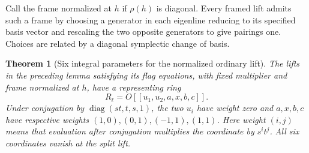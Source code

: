 \documentclass[a4paper,11pt]{article}
\newtheorem{theorem}[proposition]{Theorem}
\theoremstyle{definition}
\theoremstyle{remark}
\numberwithin{equation}{section}
\begin{document}
Call the frame normalized at \(h\) if \(\rho(h)\) is diagonal.
Every framed lift admits such a frame by choosing a generator in
each eigenline reducing to its specified basis vector and rescaling
the two opposite generators to give pairings one. Choices are
related by a diagonal symplectic change of basis.

\begin{theorem}[Six integral parameters for the normalized ordinary lift]\leavevmode
\label{thm:sympordinary468}
The lifts in the preceding lemma satisfying its flag equations,
with fixed multiplier and frame normalized at \(h\), have a
representing ring
\[
              R_\ell=O[[u_1,u_2,a,x,b,c]].
\]
Under conjugation by \(\operatorname{diag}(st,t,s,1)\), the two
\(u_i\) have weight zero and \(a,x,b,c\) have respective weights
\((1,0),(0,1),(-1,1),(1,1)\). Here weight \((i,j)\) means that
evaluation after conjugation multiplies the coordinate by \(s^it^j\).
All six coordinates vanish at the split lift.
\end{theorem}
\end{document}
